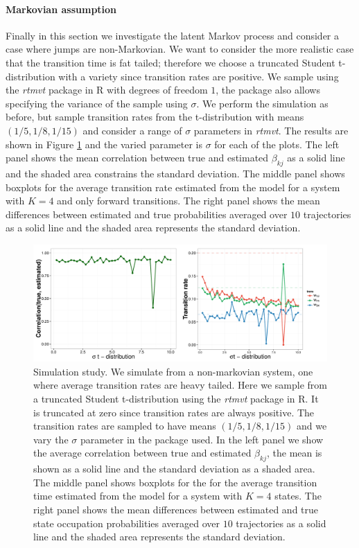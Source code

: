 \paragraph{Markovian assumption}
\label{sec:stud-t-distr}

Finally in this section we investigate the latent Markov process and consider a case where jumps are non-Markovian. We want to consider the more realistic case that the transition time is fat tailed; therefore we choose a truncated Student t-distribution with a variety since transition rates are positive. We sample using the \emph{rtmvt} package in R with degrees of freedom $1$, the package also allows specifying the variance of the sample using $\sigma$. We perform the simulation as before, but sample transition rates from the t-distribution with means $(1/5, 1/8, 1/15)$ and consider a range of $\sigma$ parameters in \emph{rtmvt}. The results are shown in Figure \ref{fig:student} and the varied parameter is $\sigma$ for each of the plots. The left panel shows the mean correlation between true and estimated $\beta_{kj}$ as a solid line and the shaded area constrains the standard deviation. The middle panel shows boxplots for the average transition rate estimated from the model for a system with $K=4$ and only forward transitions. The right panel shows the mean differences between estimated and true probabilities averaged over $10$ trajectories as a solid line and the shaded area represents the standard deviation.

\begin{figure}[h]
  \centering \includegraphics[width=1\textwidth]{pics/student-t.pdf}
  \caption{Simulation study. We simulate from a non-markovian system, one where average transition rates are heavy tailed. Here we sample from a truncated Student t-distribution using the \emph{rtmvt} package in R. It is truncated at zero since transition rates are always positive. The transition rates are sampled to have means $(1/5, 1/8, 1/15)$ and we vary the $\sigma$ parameter in the package used. In the left panel we show the average correlation between true and estimated $\beta_{kj}$, the mean is shown as a solid line and the standard deviation as a shaded area. The middle panel shows boxplots for the for the average transition time estimated from the model for a system with $K=4$ states. The right panel shows the mean differences between estimated and true state occupation probabilities averaged over $10$ trajectories as a solid line and the shaded area represents the standard deviation.}
\label{fig:student}
\end{figure}


